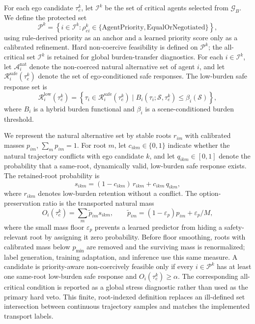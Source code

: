 \documentclass[10pt]{article}
\begin{document}
For each ego candidate $\tau^k_e$, let $\mathcal{I}^k$ be the set of critical agents selected from $\mathcal{G}_B$. We define the protected set
\begin{equation}
    \mathcal{P}^k
    =
    \left\{i\in\mathcal{I}^k:
    \rho^k_{ei}\in\{\mathrm{AgentPriority},\mathrm{EqualOrNegotiated}\}
    \right\},
    \label{eq:protected_set}
\end{equation}
using rule-derived priority as an anchor and a learned priority score only as a calibrated refinement. Hard non-coercive feasibility is defined on $\mathcal{P}^k$; the all-critical set $\mathcal{I}^k$ is retained for global burden-transfer diagnostics. For each $i\in\mathcal{I}^k$, let $\mathcal{A}^{\mathrm{nat}}_i$ denote the non-coerced natural alternative set of agent $i$, and let $\mathcal{R}^{\mathrm{safe}}_i(\tau^k_e)$ denote the set of ego-conditioned safe responses. The low-burden safe response set is
\begin{equation}
    \mathcal{R}^{\mathrm{low}}_i(\tau^k_e)
    =
    \left\{
    \tau_i \in \mathcal{R}^{\mathrm{safe}}_i(\tau^k_e)
    \mid
    B_i(\tau_i;\mathcal{S},\tau^k_e)
    \le
    \beta_i(\mathcal{S})
    \right\},
\end{equation}
where $B_i$ is a hybrid burden functional and $\beta_i$ is a scene-conditioned burden threshold.

We represent the natural alternative set by stable roots $r_{im}$ with calibrated masses $p_{im}$, $\sum_m p_{im}=1$. For root $m$, let $c_{ikm}\in\{0,1\}$ indicate whether the natural trajectory conflicts with ego candidate $k$, and let $q_{ikm}\in[0,1]$ denote the probability that a same-root, dynamically valid, low-burden safe response exists. The retained-root probability is
\begin{equation}
    s_{ikm}=(1-c_{ikm})\,r_{ikm}+c_{ikm}\,q_{ikm},
\end{equation}
where $r_{ikm}$ denotes low-burden retention without a conflict. The option-preservation ratio is the transported natural mass
\begin{equation}
    O_i(\tau^k_e)=\sum_m \widetilde p_{im}s_{ikm},
    \qquad
    \widetilde p_{im}=(1-\varepsilon_p)p_{im}+\varepsilon_p/M,
    \label{eq:option_preservation}
\end{equation}
where the small mass floor $\varepsilon_p$ prevents a learned predictor from hiding a safety-relevant root by assigning it zero probability. Before floor smoothing, roots with calibrated mass below $p_{\min}$ are removed and the surviving mass is renormalized; label generation, training adaptation, and inference use this same measure. A candidate is priority-aware non-coercively feasible only if every $i\in\mathcal{P}^k$ has at least one same-root low-burden safe response and $O_i(\tau^k_e)\ge\alpha$. The corresponding all-critical condition is reported as a global stress diagnostic rather than used as the primary hard veto. This finite, root-indexed definition replaces an ill-defined set intersection between continuous trajectory samples and matches the implemented transport labels.
\end{document}
